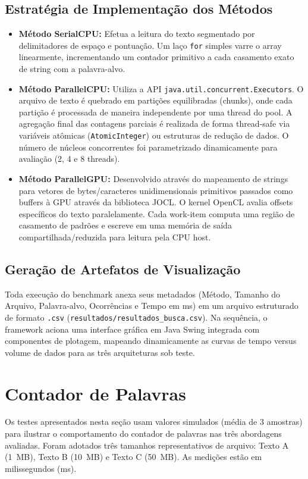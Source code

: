 \documentclass[11pt,a4paper]{article}
\begin{document}
\subsection{Estratégia de Implementação dos Métodos}
\begin{itemize}
	\item \textbf{Método SerialCPU:} Efetua a leitura do texto segmentado por delimitadores de espaço e pontuação. Um laço \texttt{for} simples varre o array linearmente, incrementando um contador primitivo a cada casamento exato de string com a palavra-alvo.
	\item \textbf{Método ParallelCPU:} Utiliza a API \texttt{java.util.concurrent.Executors}. O arquivo de texto é quebrado em partições equilibradas (chunks), onde cada partição é processada de maneira independente por uma thread do pool. A agregação final das contagens parciais é realizada de forma thread-safe via variáveis atômicas (\texttt{AtomicInteger}) ou estruturas de redução de dados. O número de núcleos concorrentes foi parametrizado dinamicamente para avaliação (2, 4 e 8 threads).
	\item \textbf{Método ParallelGPU:} Desenvolvido através do mapeamento de strings para vetores de bytes/caracteres unidimensionais primitivos passados como buffers à GPU através da biblioteca JOCL. O kernel OpenCL avalia offsets específicos do texto paralelamente. Cada work-item computa uma região de casamento de padrões e escreve em uma memória de saída compartilhada/reduzida para leitura pela CPU host.
\end{itemize}

\subsection{Geração de Artefatos de Visualização}
Toda execução do benchmark anexa seus metadados (Método, Tamanho do Arquivo, Palavra-alvo, Ocorrências e Tempo em ms) em um arquivo estruturado de formato \texttt{.csv} (\texttt{resultados/resultados\_busca.csv}). Na sequência, o framework aciona uma interface gráfica em Java Swing integrada com componentes de plotagem, mapeando dinamicamente as curvas de tempo versus volume de dados para as três arquiteturas sob teste.

\section{Contador de Palavras}
Os testes apresentados nesta seção usam valores simulados (média de 3 amostras) para ilustrar o comportamento do contador de palavras nas três abordagens avaliadas. Foram adotados três tamanhos representativos de arquivo: Texto A (1~MB), Texto B (10~MB) e Texto C (50~MB). As medições estão em milissegundos (ms).
\end{document}
